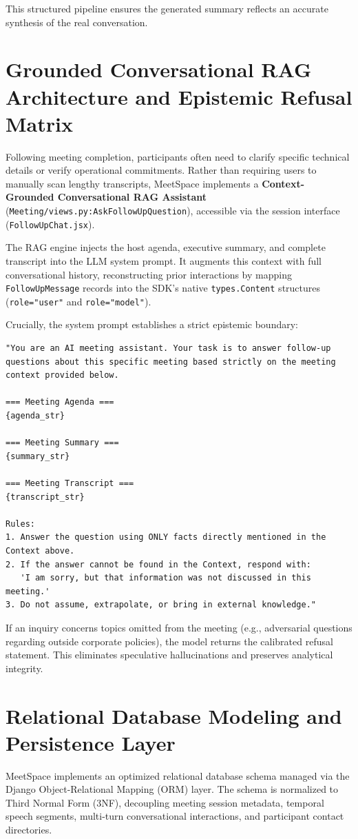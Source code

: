 \documentclass[12pt,oneside,letterpaper]{report}
\numberwithin{equation}{chapter} %
\begin{document}
This structured pipeline ensures the generated summary reflects an accurate synthesis of the real conversation.

\section{Grounded Conversational RAG Architecture and Epistemic Refusal Matrix}
Following meeting completion, participants often need to clarify specific technical details or verify operational commitments. Rather than requiring users to manually scan lengthy transcripts, MeetSpace implements a \textbf{Context-Grounded Conversational RAG Assistant} (\texttt{Meeting/views.py:AskFollowUpQuestion}), accessible via the session interface (\texttt{FollowUpChat.jsx}).

The RAG engine injects the host agenda, executive summary, and complete transcript into the LLM system prompt. It augments this context with full conversational history, reconstructing prior interactions by mapping \texttt{FollowUpMessage} records into the SDK's native \texttt{types.Content} structures (\texttt{role="user"} and \texttt{role="model"}).

Crucially, the system prompt establishes a strict epistemic boundary:
\begin{lstlisting}
"You are an AI meeting assistant. Your task is to answer follow-up questions about this specific meeting based strictly on the meeting context provided below.

=== Meeting Agenda ===
{agenda_str}

=== Meeting Summary ===
{summary_str}

=== Meeting Transcript ===
{transcript_str}

Rules:
1. Answer the question using ONLY facts directly mentioned in the Context above.
2. If the answer cannot be found in the Context, respond with:
   'I am sorry, but that information was not discussed in this meeting.'
3. Do not assume, extrapolate, or bring in external knowledge."
\end{lstlisting}

If an inquiry concerns topics omitted from the meeting (e.g., adversarial questions regarding outside corporate policies), the model returns the calibrated refusal statement. This eliminates speculative hallucinations and preserves analytical integrity.

\section{Relational Database Modeling and Persistence Layer}
MeetSpace implements an optimized relational database schema managed via the Django Object-Relational Mapping (ORM) layer. The schema is normalized to Third Normal Form (3NF), decoupling meeting session metadata, temporal speech segments, multi-turn conversational interactions, and participant contact directories.
\end{document}
